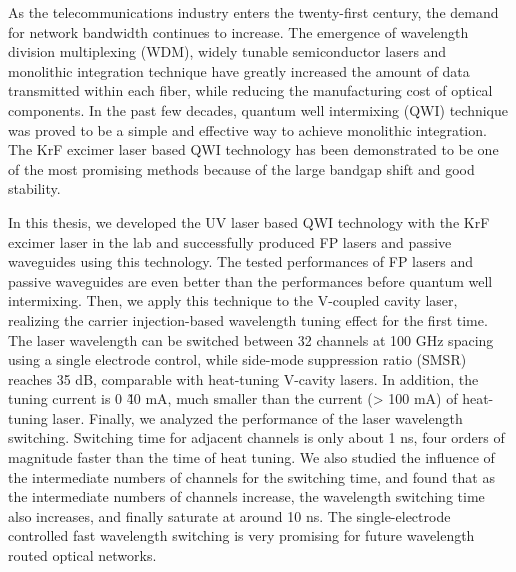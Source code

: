 \documentclass{ZJUthesis}
\begin{document}
\begin{englishabstract}

As the telecommunications industry enters the twenty-first century, the demand for network bandwidth continues to increase. The emergence of wavelength division multiplexing (WDM), widely tunable semiconductor lasers and monolithic integration technique have greatly increased the amount of data transmitted within each fiber, while reducing the manufacturing cost of optical components. In the past few decades, quantum well intermixing (QWI) technique was proved to be a simple and effective way to achieve monolithic integration. The KrF excimer laser based QWI technology has been demonstrated to be one of the most promising methods because of the large bandgap shift and good stability.

In this thesis, we developed the UV laser based QWI technology with the KrF excimer laser in the lab and successfully produced FP lasers and passive waveguides using this technology. The tested performances of FP lasers and passive waveguides are even better than the performances before quantum well intermixing. Then, we apply this technique to the V-coupled cavity laser, realizing the carrier injection-based wavelength tuning effect for the first time. The laser wavelength can be switched between 32 channels at 100 GHz spacing using a single electrode control, while side-mode suppression ratio (SMSR) reaches 35 dB, comparable with heat-tuning V-cavity lasers. In addition, the tuning current is 0 \~ 40 mA, much smaller than the current (> 100 mA) of heat-tuning laser. Finally, we analyzed the performance of the laser wavelength switching. Switching time for adjacent channels is only about 1 ns, four orders of magnitude faster than the time of heat tuning. We also studied the influence of the intermediate numbers of channels for the switching time, and found that as the intermediate numbers of channels increase, the wavelength switching time also increases, and finally saturate at around 10 ns. The single-electrode controlled fast wavelength switching is very promising for future wavelength routed optical networks.

\end{englishabstract}
\ZJUcontents
\ZJUmainmatter
\end{document}

